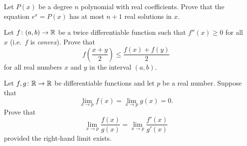 \begin{problem}
	\gim
	Let $P(x)$ be a degree $n$ polynomial with real coefficients.
	Prove that the equation $e^x = P(x)$ has at most $n+1$ real solutions in $x$.
\end{problem}

\begin{problem}
	Let $f \colon (a,b) \to \mathbb R$ be a twice differentiable function
	such that $f''(x) \ge 0$ for all $x$
	(i.e.\ $f$ is \emph{convex}).
	Prove that
	\[ f\left( \frac{x+y}{2} \right)
		\le \frac{f(x) + f(y)}{2} \]
	for all real numbers $x$ and $y$ in the interval $(a,b)$.
\end{problem}

\begin{problem}
	Let $f,g \colon \mathbb R \to \mathbb R$ be differentiable functions
	and let $p$ be a real number.
	Suppose that
	\[ \lim_{x \to p} f(x) = \lim_{x \to p} g(x) = 0. \]
	Prove that
	\[ \lim_{x \to p} \frac{f(x)}{g(x)}
		= \lim_{x \to p} \frac{f'(x)}{g'(x)} \]
	provided the right-hand limit exists.
\end{problem}

